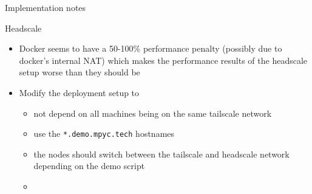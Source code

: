 \begin{frame}[fragile]{Implementation notes}
\protect\hypertarget{implementation-notes}{}
\begin{block}{Headscale}
\protect\hypertarget{headscale}{}
\begin{itemize}
\tightlist
\item
  Docker seems to have a 50-100\% performance penalty (possibly due to
  docker's internal NAT) which makes the performance results of the
  headscale setup worse than they should be
\item
  Modify the deployment setup to

  \begin{itemize}
  \tightlist
  \item
    not depend on all machines being on the same tailscale network
  \item
    use the \texttt{*.demo.mpyc.tech} hostnames
  \item
    the nodes should switch between the tailscale and headscale network
    depending on the demo script
  \item
  \end{itemize}
\end{itemize}
\end{block}
\end{frame}

